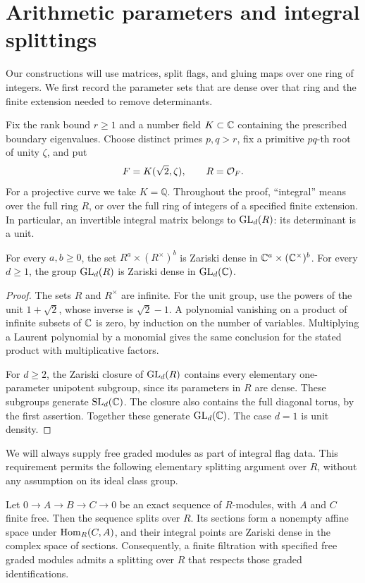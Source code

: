 \section{Arithmetic parameters and integral splittings}
\label{sec:arithmetic}

Our constructions will use matrices, split flags, and gluing maps over one
ring of integers.  We first record the parameter sets that are dense over
that ring and the finite extension needed to remove determinants.

Fix the rank bound $r\geq 1$ and a number field $K\subset\mathbb C$ containing
the prescribed boundary eigenvalues.  Choose distinct primes $p,q>r$,
fix a primitive $pq$-th root of unity $\zeta$, and put
\[
 F=K(\sqrt{2},\zeta),\qquad R=\mathcal O_F.
\]
For a projective curve we take $K=\mathbb Q$.  Throughout the proof,
``integral'' means over the full ring $R$, or over the full ring of
integers of a specified finite extension.  In particular, an invertible
integral matrix belongs to $\operatorname{GL}_d(R)$: its determinant is a unit.

\begin{lemma}\label{lem:integral-parameters}
For every $a,b\geq 0$, the set
$R^a\times(R^\times)^b$ is Zariski dense in
$\mathbb C^a\times(\mathbb C^\times)^b$.  For every $d\geq 1$, the group
$\operatorname{GL}_d(R)$ is Zariski dense in $\operatorname{GL}_d(\mathbb C)$.
\end{lemma}

\begin{proof}
The sets $R$ and $R^\times$ are infinite.  For the unit group,
use the powers of the unit $1+\sqrt{2}$, whose inverse is
$\sqrt{2}-1$.  A polynomial vanishing on a product of infinite subsets
of $\mathbb C$ is zero, by induction on the number of variables.  Multiplying
a Laurent polynomial by a monomial gives the same conclusion for the
stated product with multiplicative factors.

For $d\geq 2$, the Zariski closure of $\operatorname{GL}_d(R)$ contains every elementary
one-parameter unipotent subgroup, since its parameters in $R$ are dense.
These subgroups generate $\operatorname{SL}_d(\mathbb C)$.  The closure also contains the full
diagonal torus, by the first assertion.  Together these generate
$\operatorname{GL}_d(\mathbb C)$.  The case $d=1$ is unit density.
\end{proof}

We will always supply free graded modules as part of integral flag data.
This requirement permits the following elementary splitting argument over
$R$, without any assumption on its ideal class group.

\begin{lemma}\label{lem:free-splittings}
Let $0\to A\to B\to C\to 0$ be an exact sequence of $R$-modules, with
$A$ and $C$ finite free.  Then the sequence splits over $R$.  Its sections
form a nonempty affine space under $\operatorname{Hom}_R(C,A)$, and their integral
points are Zariski dense in the complex space of sections.
Consequently, a finite filtration with specified free graded modules
admits a splitting over $R$ that respects those graded identifications.
\end{lemma}

